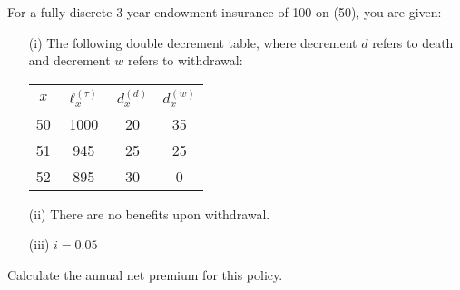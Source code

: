 For a fully discrete 3-year endowment insurance of 100 on (50), you are given:
\begin{itemize}
\item[(i)] The following double decrement table, where decrement $d$ refers to death and decrement $w$ refers to withdrawal:
\begin{center}\begin{tabular}{c|ccc}
   $x$ & $\ell_x^{(\tau)}$  & $d_x^{(d)}$ & $d_x^{(w)}$ \\ \hline
   50 & 1000 & 20 & 35 \\   
   51 & 945   & 25 & 25 \\ 
   52 & 895   & 30 & 0
 \end{tabular}\end{center}

\item[(ii)] There are no benefits upon withdrawal.
\item[(iii)] $i=0.05$
\end{itemize}
Calculate the annual net premium for this policy.
